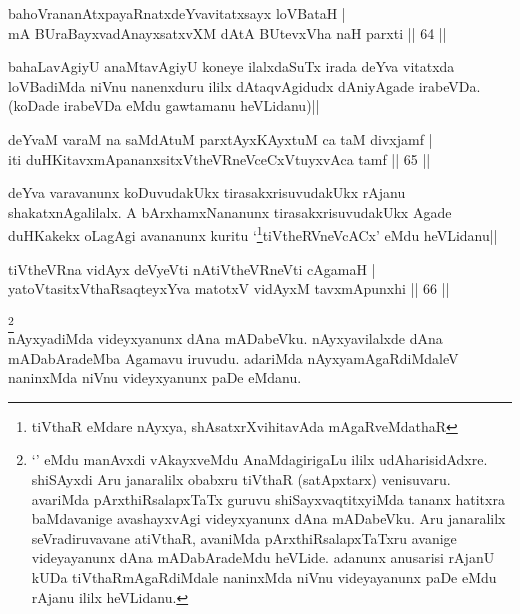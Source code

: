 \begin{shl}
bahoVrananAtxpayaRnatxdeYvavitatxsayx loVBataH | \\
mA BUraBayxvadAnayxsatxvXM dAtA BUtevxVha naH parxti \hfill|| 64 || 
\end{shl}

\begin{artha}
bahaLavAgiyU anaMtavAgiyU koneye ilalxdaSuTx irada deYva vitatxda 
loVBadiMda niVnu nanenxduru ililx dAtaqvAgidudx dAniyAgade irabeVDa. 
(koDade irabeVDa eMdu gawtamanu heVLidanu)||
\end{artha}


\begin{shl}
deYvaM varaM na saMdAtuM parxtAyxKAyxtuM ca taM divxjamf | \\
iti duHKitavxmApananxsitxVtheVRneVceCxVtuyxvAca tamf \hfill|| 65 || 
\end{shl}

\begin{artha}
deYva varavanunx koDuvudakUkx tirasakxrisuvudakUkx rAjanu 
shakatxnAgalilalx. A bArxhamxNananunx tirasakxrisuvudakUkx Agade 
duHKakekx oLagAgi avananunx kuritu `\footnote[1]{tiVthaR eMdare 
nAyxya, shAsatxrXvihitavAda mAgaRveMdathaR}tiVtheRVneVcACx' eMdu heVLidanu||
\end{artha}


\begin{shl}
tiVtheVRna vidAyx deVyeVti nAtiVtheVRneVti cA\s \s gamaH | \\
yatoV\s tasitxVthaRsaqteyxYva matotxV vidAyxM tavxmApunxhi \hfill|| 66 || 
\end{shl}


\begin{artha}
\footnote[2]{`\stext' eMdu manAvxdi vAkayxveMdu AnaMdagirigaLu ililx 
udAharisidAdxre. shiSAyxdi Aru janaralilx obabxru tiVthaR (satApxtarx) 
venisuvaru. avariMda pArxthiRsalapxTaTx guruvu shiSayxvaqtitxyiMda 
tananx hatitxra baMdavanige avashayxvAgi videyxyanunx dAna mADabeVku. 
Aru janaralilx seVradiruvavane atiVthaR, avaniMda pArxthiRsalapxTaTxru 
avanige videyayanunx dAna mADabAradeMdu heVLide. adanunx anusarisi 
rAjanU kUDa tiVthaRmAgaRdiMdale naninxMda niVnu videyayanunx paDe eMdu 
rAjanu ililx heVLidanu.}\\
nAyxyadiMda videyxyanunx dAna mADabeVku. nAyxyavilalxde dAna 
mADabAradeMba Agamavu iruvudu. adariMda nAyxyamAgaRdiMdaleV naninxMda 
niVnu videyxyanunx paDe eMdanu.
\end{artha}

